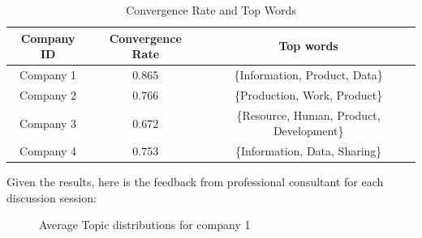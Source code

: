 \documentclass[senior]{IPSstyle}
\begin{document}
\begin{table}[h]
\caption{Convergence Rate and Top Words}
\label{table 6: similarity}
\centering
{\begin{tabular}{|c|c|c|}
\hline
\textbf{Company ID}&\textbf{Convergence Rate}&\textbf{Top words}\\
\hline
Company 1&0.865&\{Information, Product, Data\}  \\
\hline
Company 2&0.766&\{Production, Work, Product\} \\
\hline
Company 3&0.672&\{Resource, Human, Product, Development\} \\
\hline
Company 4&0.753&\{Information, Data, Sharing\} \\
\hline
\end{tabular}}
\end{table}

Given the results, here is the feedback from professional consultant for each discussion session:

\begin{figure}[h]
    \begin{center}
    \end{center}
\vspace{-0.3cm}
    \caption{Average Topic distributions for company 1}
    \label{fig_c1}
    \vspace{-0.3cm}
\end{figure} 
\end{document}
